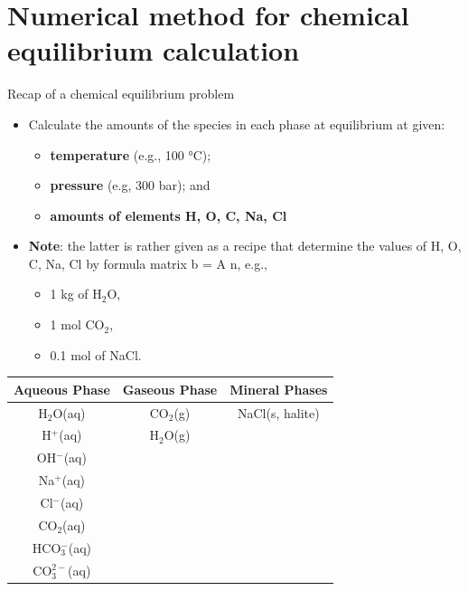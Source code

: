 \section{Numerical method for chemical equilibrium calculation}
%
%
\begin{frame}{Recap of a chemical equilibrium problem}

\lcol
\begin{itemize}
\item Calculate the amounts of the species in each phase at equilibrium
at given:
\begin{itemize}
\item \textbf{temperature} (e.g., 100 °C);
\item \textbf{pressure} (e.g, 300 bar); and 
\item \textbf{amounts of elements H, O, C, Na, Cl} 
\end{itemize}
\item \textbf{Note}: the latter is rather given as a recipe that determine the values of H, O, C, Na, Cl by formula matrix b = A n, e.g., 
\begin{itemize}
\item 1 kg of H$_{2}$O,
\item 1 mol CO$_{2}$, 
\item 0.1 mol of NaCl.
\end{itemize}
\end{itemize}
\rcol
\begin{center}
\begin{table}
\centering
\scriptsize%
\begin{tabular}{ccc}
\toprule 
\multicolumn{1}{c}{\textbf{Aqueous Phase}} & \textbf{Gaseous Phase} & \textbf{Mineral Phases}\tabularnewline
\midrule
H$_{2}$O(aq) & CO$_{2}$(g) & NaCl(s, halite)\tabularnewline
H$^{+}$(aq) & H$_{2}$O(g) & \tabularnewline
OH$^{-}$(aq) &  & \tabularnewline
Na$^{+}$(aq) &  & \tabularnewline
Cl$^{-}$(aq) &  & \tabularnewline
\multicolumn{1}{c}{CO$_{2}$(aq)} &  & \tabularnewline
HCO$_{3}^{-}$(aq) &  & \tabularnewline
\multicolumn{1}{c}{CO$_{3}^{2-}$(aq)} &  & \tabularnewline
\bottomrule
\end{tabular}
\end{table}
\par\end{center}

\ecol
\end{frame}
